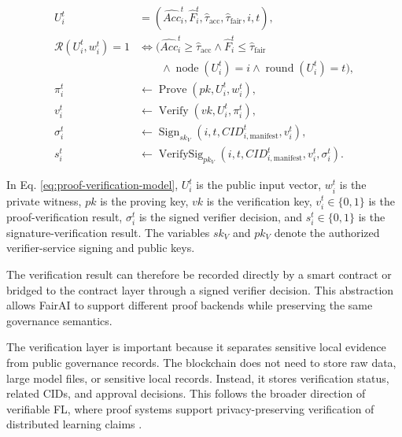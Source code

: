 \documentclass[futureinternet,article,submit,pdftex,moreauthors]{Definitions/mdpi}
\begin{document}
\begin{subequations}
	\label{eq:proof-verification-model}
	\begin{align}
		U_i^t
		&=
		\left(
		\widehat{Acc}_i^t,
		\widehat{F}_i^t,
		\widehat{\tau}_{\mathrm{acc}},
		\widehat{\tau}_{\mathrm{fair}},
		i,
		t
		\right),
		\label{eq:public-input-vector}
		\\
		\mathcal{R}(U_i^t,w_i^t)=1
		&\iff
		\Big(
		\widehat{Acc}_i^t \geq \widehat{\tau}_{\mathrm{acc}}
		\land
		\widehat{F}_i^t \leq \widehat{\tau}_{\mathrm{fair}}
		\nonumber\\
		&\qquad\land
		\operatorname{node}(U_i^t)=i
		\land
		\operatorname{round}(U_i^t)=t
		\Big),
		\label{eq:proof-relation}
		\\
		\pi_i^t
		&\leftarrow
		\operatorname{Prove}(pk,U_i^t,w_i^t),
		\label{eq:proof-generation}
		\\
		v_i^t
		&\leftarrow
		\operatorname{Verify}(vk,U_i^t,\pi_i^t),
		\label{eq:proof-verification}
		\\
		\sigma_i^t
		&\leftarrow
		\operatorname{Sign}_{sk_V}
		(i,t,CID_{i,\mathrm{manifest}}^t,v_i^t),
		\label{eq:signed-verifier-decision}
		\\
		s_i^t
		&\leftarrow
		\operatorname{VerifySig}_{pk_V}
		(i,t,CID_{i,\mathrm{manifest}}^t,v_i^t,\sigma_i^t).
		\label{eq:signature-verification}
	\end{align}
\end{subequations}

In Eq. \eqref{eq:proof-verification-model}, \(U_i^t\) is the public input vector, \(w_i^t\) is the private witness, \(pk\) is the proving key, \(vk\) is the verification key, \(v_i^t \in \{0,1\}\) is the proof-verification result, \(\sigma_i^t\) is the signed verifier decision, and \(s_i^t \in \{0,1\}\) is the signature-verification result. The variables \(sk_V\) and \(pk_V\) denote the authorized verifier-service signing and public keys.

The verification result can therefore be recorded directly by a smart contract or bridged to the contract layer through a signed verifier decision. This abstraction allows FairAI to support different proof backends while preserving the same governance semantics.

The verification layer is important because it separates sensitive local evidence from public governance records. The blockchain does not need to store raw data, large model files, or sensitive local records. Instead, it stores verification status, related CIDs, and approval decisions. This follows the broader direction of verifiable FL, where proof systems support privacy-preserving verification of distributed learning claims \cite{intro_9,intro_10,intro_14,rw_22}.
\end{document}
